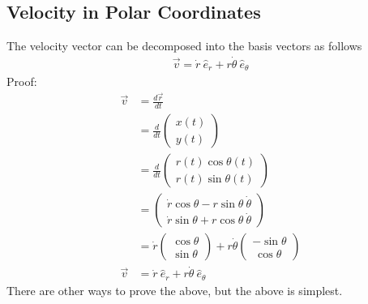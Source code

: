 \documentclass{article}
\begin{document}
\subsection{Velocity in Polar Coordinates}
The velocity vector can be decomposed into the basis vectors as follows
\begin{align}
    \vec{v} = \dot{r}\ \hat{e}_r + r \dot{\theta}\ \hat{e}_\theta
\end{align}
Proof:
\begin{align}
    \vec{v} &= \frac{d\vec{r}}{dt} \\
    &= \frac{d}{dt} \left(\begin{array}{l}
         x(t) \\
         y(t) 
    \end{array}\right) \\
    &= \frac{d}{dt} \left(\begin{array}{l}
         r(t) \cos \theta(t) \\
         r(t) \sin \theta(t)
    \end{array}\right) \\
    &= \left(\begin{array}{l}
         \dot{r} \cos\theta - r\sin\theta\ \dot\theta \\
         \dot{r} \sin\theta + r\cos\theta\ \dot\theta
    \end{array}\right) \\
    &= \dot{r} \left(\begin{array}{l}
         \cos\theta \\
         \sin\theta
    \end{array}\right) + r \dot{\theta} \left(\begin{array}{l}
         -\sin\theta \\
         \ \cos\theta
    \end{array}\right) \\
    \vec{v} &= \dot{r}\ \hat{e}_r + r \dot{\theta}\ \hat{e}_\theta \label{eq:vpolar}
\end{align}
There are other ways to prove the above, but the above is simplest.
\end{document}

